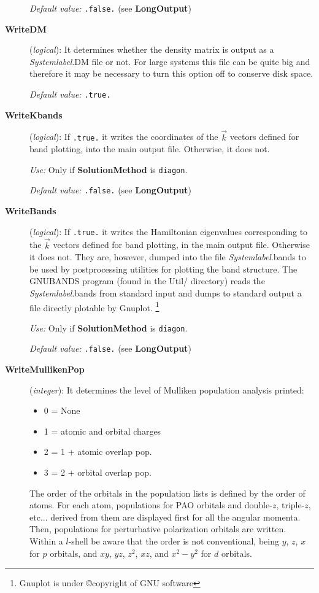 \begin{description}
{\it Default value:} {\tt .false.} (see {\bf LongOutput})

\item[{\bf WriteDM}] ({\it logical}):
It determines whether the density matrix is output as a {\it Systemlabel}.DM file or
not. For large systems this file can be quite big and therefore it
may be necessary to turn this option off to conserve disk space.

{\it Default value:} {\tt .true.}

\item[{\bf WriteKbands}] ({\it logical}):
If {\tt .true.} it writes the coordinates of the $\vec k$ vectors
defined for band plotting, into the main output file.
Otherwise, it does not.

{\it Use:} Only if {\bf SolutionMethod} is {\tt diagon}.

{\it Default value:} {\tt .false.} (see {\bf LongOutput})


\item[{\bf WriteBands}] ({\it logical}):
If {\tt .true.} it writes the Hamiltonian eigenvalues corresponding to
the $\vec k$ vectors defined for band plotting, in the main output file.
Otherwise it does not. They are, however, dumped into the file 
{\it Systemlabel}.bands to be used by postprocessing utilities for 
plotting the band structure. The GNUBANDS
program (found in the Util/ directory) reads the {\it Systemlabel}.bands
from standard input and dumps to standard output a file directly
plotable by {\sc Gnuplot}.
\footnote{{\sc Gnuplot} is under \copyright copyright of GNU software}

{\it Use:} Only if {\bf SolutionMethod} is {\tt diagon}.
 
{\it Default value:} {\tt .false.} (see {\bf LongOutput})


\item[{\bf WriteMullikenPop}] ({\it integer}): 
It determines the level of Mulliken population analysis printed:
\begin{itemize}
\item 0 = None
\item 1 = atomic and orbital charges
\item 2 = 1 + atomic overlap pop.
\item 3 = 2 + orbital overlap pop.
\end{itemize}
The order of the orbitals in the population lists is defined
by the order of atoms. For each atom, populations for PAO orbitals and
double-$z$, triple-$z$, etc... derived from them are displayed first for 
all the angular momenta. Then, populations for perturbative polarization
orbitals are written.
Within a $l$-shell be aware that the order is not
conventional, being $y$, $z$, $x$ for $p$ orbitals, and
$xy$, $yz$, $z^2$, $xz$, and $x^2-y^2$ for $d$ orbitals. 


\end{description}
